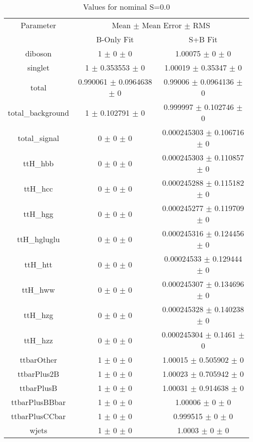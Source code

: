 \begin{table}
\centering
\caption{Values for nominal S=0.0}
\begin{tabular}{ccc}
\toprule
Parameter & \multicolumn{2}{c}{Mean $\pm$ Mean Error $\pm$ RMS}\\
 & B-Only Fit & S+B Fit\\
\midrule
diboson & \num{1} $\pm$ \num{0} $\pm$ \num{0} & \num{1.00075} $\pm$ \num{0} $\pm$ \num{0}\\
singlet & \num{1} $\pm$ \num{0.353553} $\pm$ \num{0} & \num{1.00019} $\pm$ \num{0.35347} $\pm$ \num{0}\\
total & \num{0.990061} $\pm$ \num{0.0964638} $\pm$ \num{0} & \num{0.99006} $\pm$ \num{0.0964136} $\pm$ \num{0}\\
total\_background & \num{1} $\pm$ \num{0.102791} $\pm$ \num{0} & \num{0.999997} $\pm$ \num{0.102746} $\pm$ \num{0}\\
total\_signal & \num{0} $\pm$ \num{0} $\pm$ \num{0} & \num{0.000245303} $\pm$ \num{0.106716} $\pm$ \num{0}\\
ttH\_hbb & \num{0} $\pm$ \num{0} $\pm$ \num{0} & \num{0.000245303} $\pm$ \num{0.110857} $\pm$ \num{0}\\
ttH\_hcc & \num{0} $\pm$ \num{0} $\pm$ \num{0} & \num{0.000245288} $\pm$ \num{0.115182} $\pm$ \num{0}\\
ttH\_hgg & \num{0} $\pm$ \num{0} $\pm$ \num{0} & \num{0.000245277} $\pm$ \num{0.119709} $\pm$ \num{0}\\
ttH\_hgluglu & \num{0} $\pm$ \num{0} $\pm$ \num{0} & \num{0.000245316} $\pm$ \num{0.124456} $\pm$ \num{0}\\
ttH\_htt & \num{0} $\pm$ \num{0} $\pm$ \num{0} & \num{0.00024533} $\pm$ \num{0.129444} $\pm$ \num{0}\\
ttH\_hww & \num{0} $\pm$ \num{0} $\pm$ \num{0} & \num{0.000245307} $\pm$ \num{0.134696} $\pm$ \num{0}\\
ttH\_hzg & \num{0} $\pm$ \num{0} $\pm$ \num{0} & \num{0.000245328} $\pm$ \num{0.140238} $\pm$ \num{0}\\
ttH\_hzz & \num{0} $\pm$ \num{0} $\pm$ \num{0} & \num{0.000245304} $\pm$ \num{0.1461} $\pm$ \num{0}\\
ttbarOther & \num{1} $\pm$ \num{0} $\pm$ \num{0} & \num{1.00015} $\pm$ \num{0.505902} $\pm$ \num{0}\\
ttbarPlus2B & \num{1} $\pm$ \num{0} $\pm$ \num{0} & \num{1.00023} $\pm$ \num{0.705942} $\pm$ \num{0}\\
ttbarPlusB & \num{1} $\pm$ \num{0} $\pm$ \num{0} & \num{1.00031} $\pm$ \num{0.914638} $\pm$ \num{0}\\
ttbarPlusBBbar & \num{1} $\pm$ \num{0} $\pm$ \num{0} & \num{1.00006} $\pm$ \num{0} $\pm$ \num{0}\\
ttbarPlusCCbar & \num{1} $\pm$ \num{0} $\pm$ \num{0} & \num{0.999515} $\pm$ \num{0} $\pm$ \num{0}\\
wjets & \num{1} $\pm$ \num{0} $\pm$ \num{0} & \num{1.0003} $\pm$ \num{0} $\pm$ \num{0}\\
\bottomrule
\end{tabular}
\end{table}